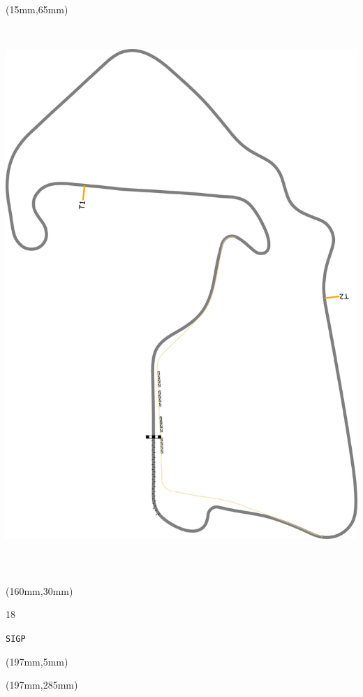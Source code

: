 \begin{textblock*}{185mm}(15mm,65mm)%
\centering
\mbox{\includegraphics[width=185mm,height=210mm,keepaspectratio]{PT/SIGP.pdf}}
\end{textblock*}
\begin{textblock*}{40mm}(160mm,30mm)%
\Large
\par{} 
\par18 
\par\hfill\tiny\tt SIGP\\
\end{textblock*}
\begin{textblock*}{20mm}(197mm,5mm)%
\fbox{\thepage}
\label{SIGP}
\end{textblock*}
\begin{textblock*}{20mm}(197mm,285mm)%
\fbox{\thepage}
\end{textblock*}


